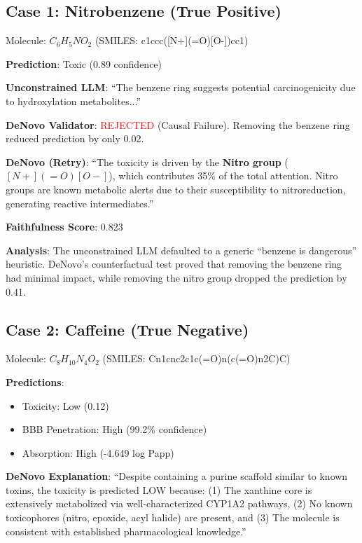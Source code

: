 \documentclass[conference]{IEEEtran}
\begin{document}
\subsection{Case 1: Nitrobenzene (True Positive)}

Molecule: $C_6H_5NO_2$ (SMILES: c1ccc([N+](=O)[O-])cc1)

\textbf{Prediction}: Toxic (0.89 confidence)

\textbf{Unconstrained LLM}: ``The benzene ring suggests potential carcinogenicity due to hydroxylation metabolites...''

\textbf{DeNovo Validator}: \textcolor{red}{REJECTED} (Causal Failure). Removing the benzene ring reduced prediction by only 0.02.

\textbf{DeNovo (Retry)}: ``The toxicity is driven by the \textbf{Nitro group} ($[N+](=O)[O-]$), which contributes 35\% of the total attention. Nitro groups are known metabolic alerts due to their susceptibility to nitroreduction, generating reactive intermediates.''

\textbf{Faithfulness Score}: 0.823

\textbf{Analysis}: The unconstrained LLM defaulted to a generic ``benzene is dangerous'' heuristic. DeNovo's counterfactual test proved that removing the benzene ring had minimal impact, while removing the nitro group dropped the prediction by 0.41.

\subsection{Case 2: Caffeine (True Negative)}

Molecule: $C_8H_{10}N_4O_2$ (SMILES: Cn1cnc2c1c(=O)n(c(=O)n2C)C)

\textbf{Predictions}:
\begin{itemize}
    \item Toxicity: Low (0.12)
    \item BBB Penetration: High (99.2\% confidence)
    \item Absorption: High (-4.649 log Papp)
\end{itemize}

\textbf{DeNovo Explanation}: ``Despite containing a purine scaffold similar to known toxins, the toxicity is predicted LOW because: (1) The xanthine core is extensively metabolized via well-characterized CYP1A2 pathways, (2) No known toxicophores (nitro, epoxide, acyl halide) are present, and (3) The molecule is consistent with established pharmacological knowledge.''
\end{document}

